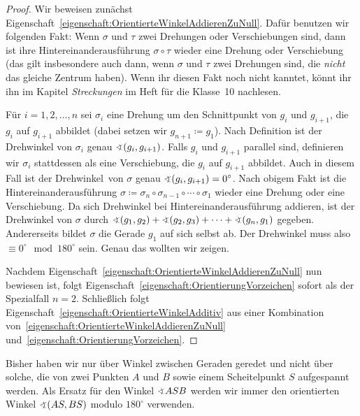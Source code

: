 \begin{proof}
	Wir beweisen zunächst Eigenschaft~\ref{eigenschaft:OrientierteWinkelAddierenZuNull}. Dafür benutzen wir folgenden Fakt: Wenn $\sigma$ und $\tau$ zwei Drehungen oder Verschiebungen sind, dann ist ihre Hintereinanderausführung $\sigma\circ\tau$ wieder eine Drehung oder Verschiebung (das gilt insbesondere auch dann, wenn $\sigma$ und $\tau$ zwei Drehungen sind, die \emph{nicht} das gleiche Zentrum haben). Wenn ihr diesen Fakt noch nicht kanntet, könnt ihr ihn im Kapitel \emph{Streckungen} im Heft für die Klasse~10 nachlesen.
	
	Für $i=1,2,\dotsc,n$ sei $\sigma_i$ eine Drehung um den Schnittpunkt von $g_i$ und $g_{i+1}$, die $g_i$ auf $g_{i+1}$ abbildet (dabei setzen wir $g_{n+1}\coloneqq g_1$). Nach Definition ist der Drehwinkel von $\sigma_i$ genau $\winkel (g_i,g_{i+1})$. Falls $g_i$ und $g_{i+1}$ parallel sind, definieren wir $\sigma_i$ stattdessen als eine Verschiebung, die $g_i$ auf $g_{i+1}$ abbildet. Auch in diesem Fall ist der \glqq Drehwinkel\grqq\ von $\sigma$ genau $\winkel (g_i,g_{i+1})=0^\circ$. Nach obigem Fakt ist die Hintereinanderausführung $\sigma\coloneqq \sigma_n\circ\sigma_{n-1}\circ\dotsb\circ\sigma_1$ wieder eine Drehung oder eine Verschiebung. Da sich Drehwinkel bei Hintereinanderausführung addieren, ist der Drehwinkel von $\sigma$ durch $\winkel(g_1,g_2) + \winkel(g_2,g_3) + \dotsb + \winkel(g_n,g_1)$ gegeben. Andererseits bildet $\sigma$ die Gerade $g_1$ auf sich selbst ab. Der Drehwinkel muss also $\equiv 0^\circ\mod 180^\circ$ sein. Genau das wollten wir zeigen.
	
	Nachdem Eigenschaft~\ref{eigenschaft:OrientierteWinkelAddierenZuNull} nun bewiesen ist, folgt Eigenschaft~\ref{eigenschaft:OrientierungVorzeichen} sofort als der Spezialfall $n=2$. Schließlich folgt Eigenschaft~\ref{eigenschaft:OrientierteWinkelAdditiv} aus einer Kombination von~\ref{eigenschaft:OrientierteWinkelAddierenZuNull} und~\ref{eigenschaft:OrientierungVorzeichen}.
\end{proof}

Bisher haben wir nur über Winkel zwischen Geraden geredet und nicht über solche, die von zwei Punkten $A$ und $B$ sowie einem Scheitelpunkt $S$ aufgespannt werden. Als Ersatz für den Winkel $\winkel ASB$ werden wir immer den orientierten Winkel $\winkel(AS,BS)$ modulo $180^\circ$ verwenden.

